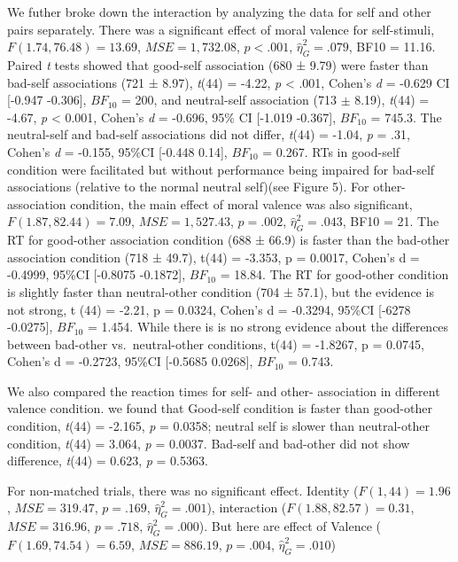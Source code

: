 \documentclass[
  english,
  man]{apa6}
\begin{document}
We futher broke down the interaction by analyzing the data for self and other pairs separately. There was a significant effect of moral valence for self-stimuli, \(F(1.74, 76.48) = 13.69\), \(\mathit{MSE} = 1,732.08\), \(p < .001\), \(\hat{\eta}^2_G = .079\), BF10 = 11.16. Paired \emph{t} tests showed that good-self association (680 ± 9.79) were faster than bad-self associations (721 ± 8.97), \emph{t}(44) = -4.22, \emph{p} \textless{} .001, Cohen's \emph{d} = -0.629 CI {[}-0.947 -0.306{]}, \(BF_{10}\) = 200, and neutral-self association (713 \(\pm\) 8.19), \emph{t}(44) = -4.67, \emph{p} \textless{} 0.001, Cohen's \emph{d} = -0.696, 95\% CI {[}-1.019 -0.367{]}, \(BF_{10}\) = 745.3. The neutral-self and bad-self associations did not differ, \emph{t}(44) = -1.04, \emph{p} = .31, Cohen's \emph{d} = -0.155, 95\%CI {[}-0.448 0.14{]}, \(BF_{10}\) = 0.267. RTs in good-self condition were facilitated but without performance being impaired for bad-self associations (relative to the normal neutral self)(see Figure 5).
For other-association condition, the main effect of moral valence was also significant, \(F(1.87, 82.44) = 7.09\), \(\mathit{MSE} = 1,527.43\), \(p = .002\), \(\hat{\eta}^2_G = .043\), BF10 = 21. The RT for good-other association condition (688 ± 66.9) is faster than the bad-other association condition (718 ± 49.7), t(44) = -3.353, p = 0.0017, Cohen's d = -0.4999, 95\%CI {[}-0.8075 -0.1872{]}, \(BF_{10}\) = 18.84. The RT for good-other condition is slightly faster than neutral-other condition (704 ± 57.1), but the evidence is not strong, t (44) = -2.21, p = 0.0324, Cohen's d = -0.3294, 95\%CI {[}-6278 -0.0275{]}, \(BF_{10}\) = 1.454. While there is is no strong evidence about the differences between bad-other vs.~neutral-other conditions, t(44) = -1.8267, p = 0.0745, Cohen's d = -0.2723, 95\%CI {[}-0.5685 0.0268{]}, \(BF_{10}\) = 0.743.

We also compared the reaction times for self- and other- association in different valence condition. we found that Good-self condition is faster than good-other condition, \emph{t}(44) = -2.165, \emph{p} = 0.0358; neutral self is slower than neutral-other condition, \emph{t}(44) = 3.064, \emph{p} = 0.0037. Bad-self and bad-other did not show difference, \emph{t}(44) = 0.623, \emph{p} = 0.5363.

For non-matched trials, there was no significant effect. Identity (\(F(1, 44) = 1.96\), \(\mathit{MSE} = 319.47\), \(p = .169\), \(\hat{\eta}^2_G = .001\)), interaction (\(F(1.88, 82.57) = 0.31\), \(\mathit{MSE} = 316.96\), \(p = .718\), \(\hat{\eta}^2_G = .000\)). But here are effect of Valence (\(F(1.69, 74.54) = 6.59\), \(\mathit{MSE} = 886.19\), \(p = .004\), \(\hat{\eta}^2_G = .010\))
\end{document}
